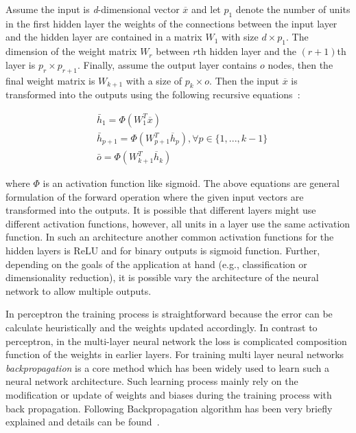 Assume the input is \textit{d}-dimensional vector $\overline{x}$ and let $p_1$ denote the number of units in the first hidden layer the weights of the connections between the input layer and the hidden layer are contained in a matrix $W_1$ with size $d\times p_1$. The dimension of the weight matrix $W_r$ between $r$th hidden layer and the $(r+1)$th layer is $p_r\times p_{r+1}$. Finally, assume the output layer contains $o$ nodes, then the final weight matrix is $W_{k+1}$ with a size of $p_k\times o$. Then the input $\overline{x}$ is transformed into the outputs using the following recursive equations~\cite{book}:

\begin{align*}
& \bar{h}_1= \Phi (W_1^{T} \overline{x}) \\
& \bar{h}_{p+1}= \Phi (W_{p+1}^{T} \overline{h}_p), \forall p \in \{1,...,k-1\} \\
& \bar{o}=\Phi (W_{k+1}^{T} \overline{h}_k)
\end{align*}

where $\Phi$ is an activation function like sigmoid. The above equations are general formulation of the forward operation where the given input vectors are transformed into the outputs. It is possible that different layers might use different activation functions, however,  all units in a layer use the same activation function. In such an architecture another common activation functions for the hidden layers is ReLU and for binary outputs is sigmoid function. 
Further, depending on the  goals of the application at hand (e.g., classification or dimensionality reduction), it is possible vary the architecture of the neural network to allow multiple outputs. 




In perceptron the training process is straightforward because the error can be calculate heuristically and the weights updated accordingly. In contrast to perceptron, in the multi-layer neural network the loss is complicated composition function of the weights in earlier layers. For training multi layer neural networks \textit{backpropagation} is a core method which has been widely used to learn such a neural network architecture.
Such learning process mainly rely on the modification or update of weights and biases during the training process with back propagation. Following Backpropagation algorithm has been very briefly explained and details can be found~\cite{}. 

